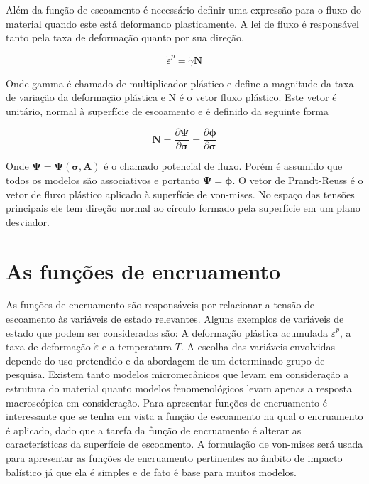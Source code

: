 Além da função de escoamento é necessário definir uma expressão para o fluxo do material quando este está deformando plasticamente. A lei de fluxo é responsável tanto pela taxa de deformação quanto por sua direção.

\begin{equation}
    \dot{\varepsilon}^p = \dot{\gamma} \boldsymbol{N}
\end{equation}

Onde \gls{gamma} é chamado de multiplicador plástico e  define a magnitude da taxa de variação da deformação plástica e \gls{N} é o vetor fluxo plástico. Este vetor é unitário, normal à superfície de escoamento e é definido da seguinte forma

\begin{equation}
    \boldsymbol{N} = \frac{\partial \boldsymbol{\Psi}}{\partial \boldsymbol{\sigma}} = \frac{\partial \boldsymbol{\phi}}{\partial \boldsymbol{\sigma}}
\end{equation}

Onde $\boldsymbol{\Psi} = \boldsymbol{\Psi}(\boldsymbol{\sigma}, \boldsymbol{A}) $ é o chamado potencial de fluxo. Porém é assumido que todos os modelos são associativos e portanto $ \boldsymbol{\Psi} = \boldsymbol{\phi} $. O vetor de Prandt-Reuss é o vetor de fluxo plástico aplicado à superfície de von-mises. No espaço das tensões principais ele tem direção normal ao círculo formado pela superfície em um plano desviador.

\section{As funções de encruamento}

As funções de encruamento são responsáveis por relacionar a tensão de escoamento às variáveis de estado relevantes. Alguns exemplos de variáveis de estado que podem ser consideradas são: A deformação plástica acumulada $ \overline{\varepsilon}^p $, a taxa de deformação $ \dot{\varepsilon} $ e a temperatura $ T $. A escolha das variáveis envolvidas depende do uso pretendido e da abordagem de um determinado grupo de pesquisa. Existem tanto modelos micromecânicos que levam em consideração a estrutura do material quanto modelos fenomenológicos levam apenas a resposta macroscópica em consideração. Para apresentar funções de encruamento é interessante que se tenha em vista a função de escoamento na qual o encruamento é aplicado, dado que a tarefa da função de encruamento é alterar as características da superfície de escoamento. A formulação de von-mises será usada para apresentar as funções de encruamento pertinentes ao âmbito de impacto balístico já que ela é simples e de fato é base para muitos modelos. \\

